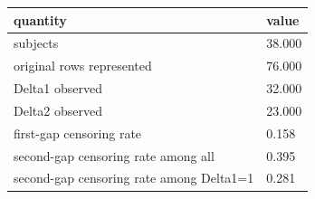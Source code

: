 \begin{tabular}{ll}
\hline
quantity & value \\
\hline
subjects & 38.000 \\
original rows represented & 76.000 \\
Delta1 observed & 32.000 \\
Delta2 observed & 23.000 \\
first-gap censoring rate & 0.158 \\
second-gap censoring rate among all & 0.395 \\
second-gap censoring rate among Delta1=1 & 0.281 \\
\hline
\end{tabular}
